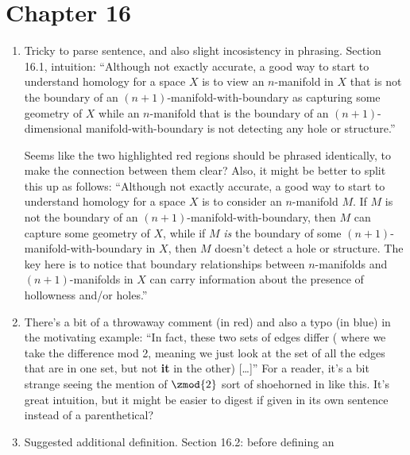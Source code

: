 \documentclass{fkletter}
\begin{document}
\section*{Chapter 16}
\begin{enumerate}
  \item Tricky to parse sentence, and also slight incosistency in phrasing.
    Section 16.1, intuition: ``Although not exactly accurate, a good way to
    start to understand homology for a space $X$ is to view an $n$-manifold in
    $X$ that is not the boundary of an
    {\color{red}$(n+1)$-manifold-with-boundary} as capturing some geometry of
    $X$ while an $n$-manifold that is the boundary of an
    {\color{red}$(n+1)$-dimensional manifold-with-boundary} is not detecting any
    hole or structure.''

    Seems like the two highlighted red regions should be phrased identically, to
    make the connection between them clear? Also, it might be better to split
    this up as follows: ``Although not exactly accurate, a good way to start to
    understand homology for a space $X$ is to consider an $n$-manifold $M$. If
    $M$ is not the boundary of an $(n+1)$-manifold-with-boundary, then $M$ can
    capture some geometry of $X$, while if $M$ \emph{is} the boundary of some
    $(n+1)$-manifold-with-boundary in $X$, then $M$ doesn't detect a hole or
    structure. The key here is to notice that boundary relationships between
    $n$-manifolds and $(n+1)$-manifolds in $X$ can carry information about the
    presence of hollowness and/or holes.''
  \item There's a bit of a throwaway comment (in red) and also a typo (in blue)
    in the motivating example: ``In fact, these two sets of edges differ
    ({\color{red} where we take the difference mod 2, meaning} we just look at
    the set of all the edges that are in one set, but not {\color{blue}\bfseries
      it} in the other) [\ldots]'' For a reader, it's a bit strange seeing the
    mention of $\zmod{2}$ sort of shoehorned in like this. It's great intuition,
    but it might be easier to digest if given in its own sentence instead of a
    parenthetical?
  \item Suggested additional definition. Section 16.2: before defining an

\end{enumerate}
\end{document}
